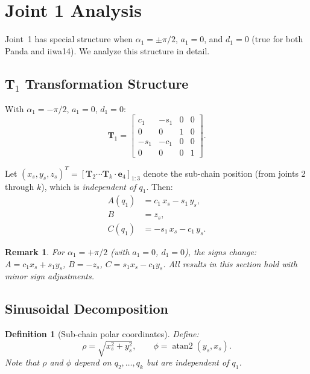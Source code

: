 \documentclass[11pt,a4paper]{article}
\newtheorem{remark}{Remark}[section]
\newtheorem{definition}{Definition}[section]
\newcommand{\bT}{\mathbf{T}}
\DeclareMathOperator{\atantwo}{atan2}
\begin{document}
\section{Joint 1 Analysis}\label{sec:q1}

Joint~1 has special structure when $\alpha_1 = \pm\pi/2$, $a_1 = 0$,
and $d_1 = 0$ (true for both Panda and iiwa14).
We analyze this structure in detail.

\subsection{$\bT_1$ Transformation Structure}

With $\alpha_1 = -\pi/2$, $a_1 = 0$, $d_1 = 0$:
\begin{equation}\label{eq:T1}
  \bT_1 = \begin{bmatrix}
    c_1  & -s_1 & 0  & 0 \\
    0    &  0   & 1  & 0 \\
    -s_1 & -c_1 & 0  & 0 \\
    0    &  0   & 0  & 1
  \end{bmatrix}.
\end{equation}

Let $(x_s, y_s, z_s)^T = [\bT_2 \cdots \bT_k \cdot \mathbf{e}_4]_{1:3}$
denote the sub-chain position (from joints 2 through $k$), which is
\emph{independent of $q_1$}. Then:
\begin{align}
  A(q_1) &= c_1\, x_s - s_1\, y_s, \label{eq:A_q1}\\
  B &= z_s, \label{eq:B_q1}\\
  C(q_1) &= -s_1\, x_s - c_1\, y_s. \label{eq:C_q1}
\end{align}

\begin{remark}
For $\alpha_1 = +\pi/2$ (with $a_1 = 0$, $d_1 = 0$), the signs change:
$A = c_1 x_s + s_1 y_s$, $B = -z_s$, $C = s_1 x_s - c_1 y_s$.
All results in this section hold with minor sign adjustments.
\end{remark}

\subsection{Sinusoidal Decomposition}

\begin{definition}[Sub-chain polar coordinates]\label{def:polar}
Define:
\begin{equation}\label{eq:rho_phi}
  \rho = \sqrt{x_s^2 + y_s^2}, \qquad
  \phi = \atantwo(y_s, x_s).
\end{equation}
Note that $\rho$ and $\phi$ depend on $q_2,\ldots,q_k$ but are
independent of $q_1$.
\end{definition}
\end{document}
